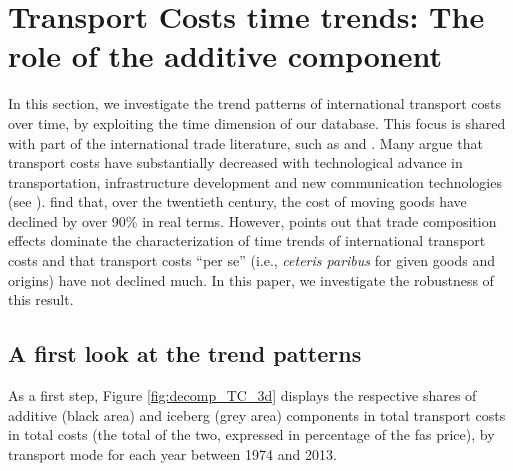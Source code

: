 \documentclass[a4paper,11pt]{article}
\begin{document}
\section{Transport Costs time trends: The role of the additive component}\label{sec:results_trends}

In this section, we investigate the trend patterns of international transport costs over time, by exploiting the time dimension of our database. This focus is shared with part of the international trade literature, such as \cite{hummels2007} and \cite{Behar_Venables}. Many argue that transport costs have substantially decreased with technological advance in transportation, infrastructure development and new communication technologies (see \citealp{Lafourcade_Thisse}). \cite{Glaeser04} find that, over the twentieth century, the cost of moving goods have declined by over 90\% in real terms. However, \cite{hummels2007} points out that trade composition effects dominate the characterization of time trends of international transport costs and that transport costs ``per se'' (i.e., \textit{ceteris paribus} for given goods and origins) have not declined much. In this paper, we investigate the robustness of this result.

\subsection{A first look at the trend patterns}

As a first step, Figure \ref{fig:decomp_TC_3d} displays the respective shares of additive (black area) and iceberg (grey area) components in total transport costs in total costs (the total of the two, expressed in percentage of the fas price), by transport mode for each year between 1974 and 2013.
\end{document}
